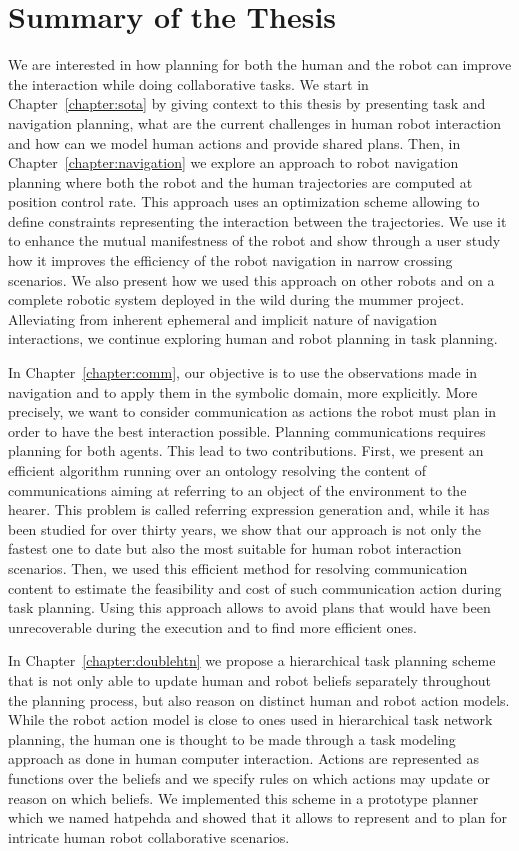 \documentclass[a4paper,11pt,twoside]{StyleThese}
\begin{document}
\section*{Summary of the Thesis}
We are interested in how planning for both the human and the robot can improve the interaction while doing collaborative tasks. We start in Chapter~\ref{chapter:sota} by giving context to this thesis by presenting task and navigation planning, what are the current challenges in human robot interaction and how can we model human actions and provide shared plans. Then, in Chapter~\ref{chapter:navigation} we explore an approach to robot navigation planning where both the robot and the human trajectories are computed at position control rate. This approach uses an optimization scheme allowing to define constraints representing the interaction between the trajectories. We use it to enhance the mutual manifestness of the robot and show through a user study how it improves the efficiency of the robot navigation in narrow crossing scenarios. We also present how we used this approach on other robots and on a complete robotic system deployed in the wild during the \acrfull{mummer} project. Alleviating from inherent ephemeral and implicit nature of navigation interactions, we continue exploring human and robot planning in task planning.

In Chapter~\ref{chapter:comm}, our objective is to use the observations made in navigation and to apply them in the symbolic domain, more explicitly. More precisely, we want to consider communication as actions the robot must plan in order to have the best interaction possible. Planning communications requires planning for both agents. This lead to two contributions. First, we present an efficient algorithm running over an ontology resolving the content of communications aiming at referring to an object of the environment to the hearer. This problem is called referring expression generation and, while it has been studied for over thirty years, we show that our approach is not only the fastest one to date but also the most suitable for human robot interaction scenarios. Then, we used this efficient method for resolving communication content to estimate the feasibility and cost of such communication action during task planning. Using this approach allows to avoid plans that would have been unrecoverable during the execution and to find more efficient ones.

In Chapter~\ref{chapter:doublehtn} we propose a hierarchical task planning scheme that is not only able to update human and robot beliefs separately throughout the planning process, but also reason on distinct human and robot action models. While the robot action model is close to ones used in hierarchical task network planning, the human one is thought to be made through a task modeling approach as done in human computer interaction. Actions are represented as functions over the beliefs and we specify rules on which actions may update or reason on which beliefs. We implemented this scheme in a prototype planner which we named \acrfull{hatpehda} and showed that it allows to represent and to plan for intricate human robot collaborative scenarios. 
\end{document}
